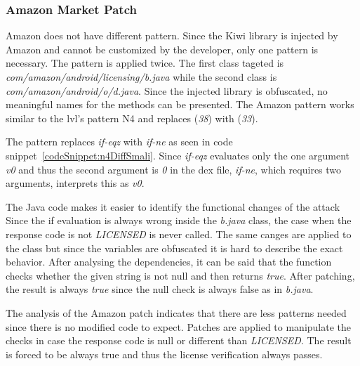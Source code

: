 \subsubsection{Amazon Market Patch}
Amazon does not have different pattern.
Since the Kiwi library is injected by Amazon and cannot be customized by the developer, only one pattern is necessary.
The pattern is applied twice.
The first class tageted is \textit{com/amazon/android/licensing/b.java} while the second class is \textit{com/amazon/android/o/d.java}.
Since the injected library is obfuscated, no meaningful names for the methods can be presented.
\newline
The Amazon pattern works similar to the \gls{lvl}'s pattern N4 and replaces (\textit{38}) with (\textit{33}).
\newline

The pattern replaces \textit{if-eqz} with \textit{if-ne} as seen in code snippet~\ref{codeSnippet:n4DiffSmali}.
Since \textit{if-eqz} evaluates only the one argument \textit{v0} and thus the second argument is \textit{0} in the \gls{dex} file, \textit{if-ne}, which requires two arguments, interprets this as \textit{v0}.

The Java code makes it easier to identify the functional changes of the attack
Since the if evaluation is always wrong inside the \textit{b.java} class, the case when the response code is not \textit{LICENSED} is never called.
The same canges are applied to the  class but since the variables are obfuscated it is hard to describe the exact behavior.
After analysing the dependencies, it can be said that the function checks whether the given string is not null and then returns \textit{true}.
After patching, the result is always \textit{true} since the null check is always false as in \textit{b.java}.
\newline


The analysis of the Amazon patch indicates that there are less patterns needed since there is no modified code to expect.
Patches are applied to manipulate the checks in case the response code is null or different than \textit{LICENSED}.
The result is forced to be always true and thus the license verification always passes.


